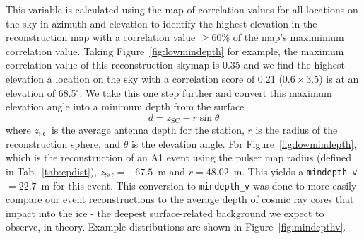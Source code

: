   This variable is calculated using the map of correlation values for all locations on the sky in azimuth and elevation to identify the highest elevation in the reconstruction map with a correlation value $\geq 60$\% of the map's maximimum correlation value.
  Taking Figure~\ref{fig:lowmindepth} for example, the maximum correlation value of this reconstruction skymap is 0.35 and we find the highest elevation a location on the sky with a correlation score of 0.21 ($0.6 \times 3.5$) is at an elevation of 68.5$^{\circ}$.
  We take this one step further and convert this maximum elevation angle into a minimum depth from the surface 
  \begin{equation}
    d = z_{\text{SC}} - r \sin{\theta}
    \label{eq:mindepth}
  \end{equation}
  where $z_{\text{SC}}$ is the average antenna depth for the station, $r$ is the radius of the reconstruction sphere, and $\theta$ is the elevation angle.
  For Figure~\ref{fig:lowmindepth}, which is the reconstruction of an A1 event using the pulser map radius (defined in Tab.~\ref{tab:cpdist}), $z_{\text{SC}}=-67.5$~m and $r=48.02$~m.
  This yields a \texttt{mindepth\_v}$=22.7$~m for this event. 
  This conversion to \texttt{mindepth\_v} was done to more easily compare our event reconstructions to the average depth of cosmic ray cores that impact into the ice - the deepest surface-related background we expect to observe, in theory.
  Example distributions are shown in Figure~\ref{fig:mindepthv}.
    
